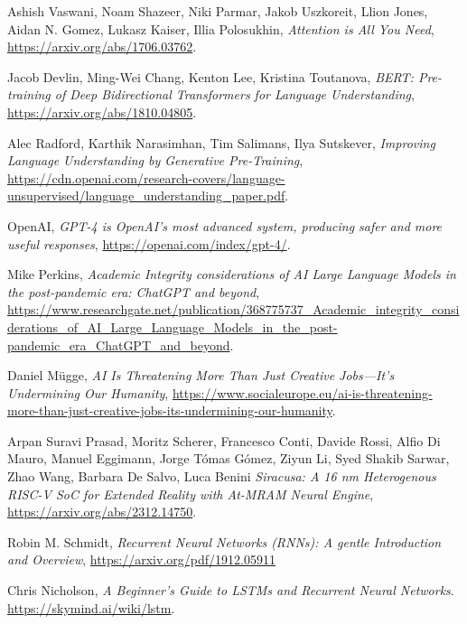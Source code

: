 \begin{thebibliography}{9}

	Ashish Vaswani, Noam Shazeer, Niki Parmar, Jakob Uszkoreit, Llion Jones, Aidan N. Gomez, Lukasz Kaiser, Illia Polosukhin,
	\textit{Attention is All You Need},
	\url{https://arxiv.org/abs/1706.03762}.

	Jacob Devlin, Ming-Wei Chang, Kenton Lee, Kristina Toutanova,
	\textit{BERT: Pre-training of Deep Bidirectional Transformers for Language Understanding},
	\url{https://arxiv.org/abs/1810.04805}.

	Alec Radford, Karthik Narasimhan, Tim Salimans, Ilya Sutskever,
	\textit{Improving Language Understanding by Generative Pre-Training},
	\url{https://cdn.openai.com/research-covers/language-unsupervised/language_understanding_paper.pdf}.

	OpenAI,
	\textit{GPT-4 is OpenAI’s most advanced system, producing safer and more useful responses},
	\url{https://openai.com/index/gpt-4/}.

	Mike Perkins,
	\textit{Academic Integrity considerations of AI Large Language Models in the post-pandemic era: ChatGPT and beyond},
	\url{https://www.researchgate.net/publication/368775737_Academic_integrity_considerations_of_AI_Large_Language_Models_in_the_post-pandemic_era_ChatGPT_and_beyond}.

	Daniel Mügge,
	\textit{AI Is Threatening More Than Just Creative Jobs—It’s Undermining Our Humanity},
	\url{https://www.socialeurope.eu/ai-is-threatening-more-than-just-creative-jobs-its-undermining-our-humanity}.


	Arpan Suravi Prasad, Moritz Scherer, Francesco Conti, Davide Rossi, Alfio Di Mauro, Manuel Eggimann, Jorge Tómas Gómez, Ziyun Li, Syed Shakib Sarwar, Zhao Wang, Barbara De Salvo, Luca Benini
	\textit{Siracusa: A 16 nm Heterogenous RISC-V SoC for Extended Reality with At-MRAM Neural Engine},
	\url{https://arxiv.org/abs/2312.14750}.

	Robin M. Schmidt,
	\textit{Recurrent Neural Networks (RNNs): A gentle Introduction and Overview},
	\url{https://arxiv.org/pdf/1912.05911}

	Chris Nicholson,
	\textit{A Beginner’s Guide to LSTMs and Recurrent Neural Networks}.
	\url{ https://skymind.ai/wiki/lstm}.


\end{thebibliography}
